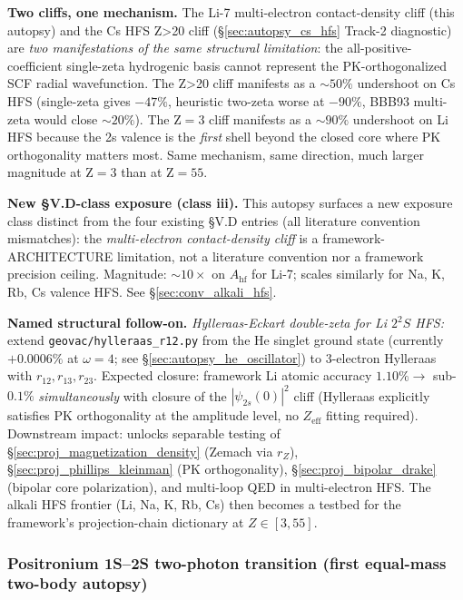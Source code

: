 \documentclass[11pt]{article}
\begin{document}
\textbf{Two cliffs, one mechanism.}  The Li-7 multi-electron
contact-density cliff (this autopsy) and the Cs HFS Z\textgreater 20 cliff
(\S\ref{sec:autopsy_cs_hfs} Track-2 diagnostic) are \emph{two manifestations
of the same structural limitation}: the all-positive-coefficient
single-zeta hydrogenic basis cannot represent the PK-orthogonalized SCF
radial wavefunction.  The Z\textgreater 20 cliff manifests as a
$\sim 50\%$ undershoot on Cs HFS (single-zeta gives $-47\%$, heuristic
two-zeta worse at $-90\%$, BBB93 multi-zeta would close $\sim 20\%$).
The Z$=3$ cliff manifests as a $\sim 90\%$ undershoot on Li HFS because
the 2s valence is the \emph{first} shell beyond the closed core where
PK orthogonality matters most.  Same mechanism, same direction, much
larger magnitude at Z$=3$ than at Z$=55$.

\textbf{New §V.D-class exposure (class iii).}  This autopsy surfaces
a new exposure class distinct from the four existing §V.D entries
(all literature convention mismatches): the \emph{multi-electron
contact-density cliff} is a framework-ARCHITECTURE limitation, not a
literature convention nor a framework precision ceiling.  Magnitude:
$\sim 10\times$ on $A_\text{hf}$ for Li-7; scales similarly for Na, K,
Rb, Cs valence HFS.  See \S\ref{sec:conv_alkali_hfs}.

\textbf{Named structural follow-on.}  \emph{Hylleraas-Eckart double-zeta
for Li $2{}^2S$ HFS:} extend \texttt{geovac/hylleraas\_r12.py} from the
He singlet ground state (currently $+0.0006\%$ at $\omega=4$; see
\S\ref{sec:autopsy_he_oscillator}) to 3-electron Hylleraas with
$r_{12}, r_{13}, r_{23}$.  Expected closure: framework Li atomic accuracy
$1.10\% \to$ sub-$0.1\%$ \emph{simultaneously} with closure of the
$|\psi_{2s}(0)|^2$ cliff (Hylleraas explicitly satisfies PK orthogonality
at the amplitude level, no $Z_\text{eff}$ fitting required).  Downstream
impact: unlocks separable testing of \S\ref{sec:proj_magnetization_density}
(Zemach via $r_Z$), \S\ref{sec:proj_phillips_kleinman} (PK orthogonality),
\S\ref{sec:proj_bipolar_drake} (bipolar core polarization), and multi-loop
QED in multi-electron HFS.  The alkali HFS frontier (Li, Na, K, Rb, Cs)
then becomes a testbed for the framework's projection-chain dictionary
at $Z \in [3, 55]$.

\subsubsection{Positronium 1S--2S two-photon transition (first equal-mass two-body autopsy)}
\label{sec:autopsy_ps_1s2s}
\end{document}
